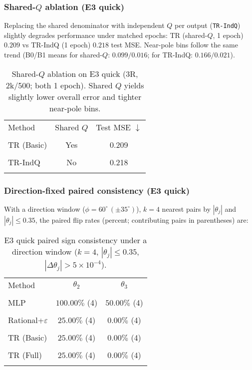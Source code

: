 \documentclass[11pt,twoside]{article}
\begin{document}
\subsubsection{Shared-$Q$ ablation (E3 quick)}

Replacing the shared denominator with independent $Q$ per output (\texttt{TR-IndQ}) slightly degrades performance under matched epochs: TR (shared-$Q$, 1 epoch) $0.209$ vs TR-IndQ (1 epoch) $0.218$ test MSE. Near-pole bins follow the same trend (B0/B1 means for shared-$Q$: $0.099/0.016$; for TR-IndQ: $0.166/0.021$).

\begin{table}[h]
  \centering\small
  \begin{tabular}{lcc}
    \toprule
    Method & Shared $Q$ & Test MSE $\downarrow$ \\\\
    \midrule
    TR (Basic) & Yes & 0.209 \\\\
    TR-IndQ & No & 0.218 \\\\
    \bottomrule
  \end{tabular}
  \caption{Shared-$Q$ ablation on E3 quick (3R, 2k/500; both 1 epoch). Shared $Q$ yields slightly lower overall error and tighter near-pole bins.}
\end{table}

\subsubsection{Direction-fixed paired consistency (E3 quick)}

With a direction window ($\phi=60^{\circ}\,(\pm35^{\circ})$), $k=4$ nearest pairs by $|\theta_j|$ and $|\theta_j|\le0.35$, the paired flip rates (percent; contributing pairs in parentheses) are:

\begin{table}[h]
  \centering\small
  \begin{tabular}{lcc}
    \toprule
    Method & $\theta_2$ & $\theta_3$ \\\\
    \midrule
    MLP & $100.00\%$ (4) & $50.00\%$ (4) \\\\
    Rational+$\varepsilon$ & $25.00\%$ (4) & $0.00\%$ (4) \\\\
    TR (Basic) & $25.00\%$ (4) & $0.00\%$ (4) \\\\
    TR (Full) & $25.00\%$ (4) & $0.00\%$ (4) \\\\
    \bottomrule
  \end{tabular}
  \caption{E3 quick paired sign consistency under a direction window ($k=4$, $|\theta_j|\le0.35$, $|\Delta\theta_j|>5\times10^{-4}$).}
\end{table}
\end{document}
